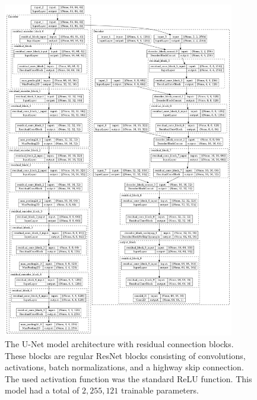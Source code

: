 \documentclass[fleqn,10pt]{SelfArx} %
\begin{document}
\setcounter{figure}{0}\renewcommand\thefigure{A\arabic{figure}}\renewcommand\thetable{A\arabic{table}}
\label{Appendix}
\begin{figure}[!t]
    \centering
    \includegraphics[width=0.9\textwidth]{report/Images/unet.png}
    \caption{The U-Net model architecture with residual connection blocks. These blocks are regular ResNet blocks consisting of convolutions, activations, batch normalizations, and a highway skip connection. The used activation function was the standard ReLU function. This model had a total of $2,255,121$ trainable parameters.}
    \label{fig:arch}
\end{figure}
\newpage
\end{document}
